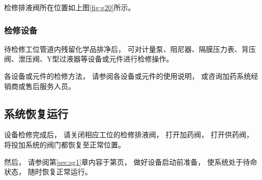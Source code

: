 \documentclass[UTF8,a4paper,12pt,titlepage]{ctexart}
\begin{document}
            \par\normalsize{检修排液阀所在位置如上图\ref{fig:g20}所示。}

    \subsubsection{检修设备}
        待检修工位管道内残留化学品排净后，
        可对计量泵、阻尼器、隔膜压力表、背压阀、泄压阀、Y型过液器等设备或元件进行检修操作。
        \par 各设备或元件的检修方法，
        请参阅各设备或元件的使用说明，
        或咨询加药系统经销商或售后服务人员。

   \subsection{系统恢复运行}
        设备检修完成后，
        请关闭相应工位的检修排液阀，
        打开加药阀，
        打开供药阀，
        将投加系统的阀门都恢复至正常位置。
        \par 然后，
        请参阅第\ref{sec:sg1}章内容于第\pageref{sec:sg1}页，
        做好设备启动前准备，
        使系统处于待命状态，
        随时恢复正常运行。
\end{document}
